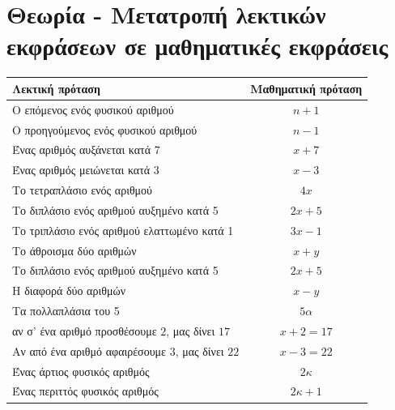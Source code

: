 \documentclass[a4paper,10pt]{report}
\begin{document}
\section*{Θεωρία - Μετατροπή λεκτικών εκφράσεων σε μαθηματικές εκφράσεις\hfill \small{}}
\begin{center}
 \begin{tabular}{|l|c|}\hline 
\textbf{Λεκτική πρόταση} \quad        &    \textbf{Μαθηματική πρόταση}       \\
\hline 
Ο επόμενος ενός φυσικού αριθμού                      & $n+1$        \\
\hline 
Ο προηγούμενος ενός φυσικού αριθμού                  & $n-1$ \\           
\hline
Ένας αριθμός αυξάνεται κατά $7$                      & $x+7$        \\
\hline
Ένας αριθμός μειώνεται κατά $3$                      & $x-3$\\
\hline
Το τετραπλάσιο ενός αριθμού                          &  $4x$     \\
\hline 
Το διπλάσιο ενός αριθμού αυξημένο κατά 5             &  $2x+5$     \\
\hline 
Το τριπλάσιο ενός αριθμού ελαττωμένο κατά 1          &  $3x-1$     \\
\hline 
Το άθροισμα δύο αριθμών                              &  $x+y$     \\
\hline 
Το διπλάσιο ενός αριθμού αυξημένο κατά 5             &  $2x+5$     \\
\hline 
Η διαφορά δύο αριθμών                                &  $x-y$     \\
\hline 
Τα πολλαπλάσια του  5                                &  $5α$     \\
\hline 
αν σ' ένα αριθμό προσθέσουμε $2$, μας δίνει $17$     &  $x+2=17$     \\
\hline 
Αν από ένα αριθμό αφαιρέσουμε $3$, μας δίνει $22$    &  $x-3=22$     \\
\hline 
Ένας άρτιος φυσικός αριθμός                          &  $2κ$     \\
\hline 
Ένας περιττός φυσικός αριθμός                        &  $2κ+1$     \\
\hline 
\end{tabular}
\end{center}
\end{document}
